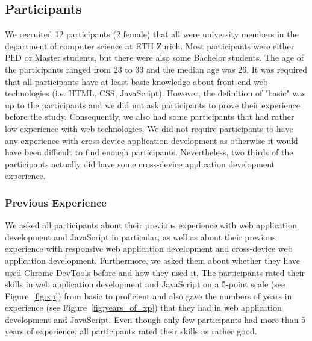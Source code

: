 \subsection{Participants}

We recruited 12 participants (2 female) that all were university members in the department of computer science at ETH Zurich. Most participants were either PhD or Master students, but there were also some Bachelor students. The age of the participants ranged from 23 to 33 and the median age was 26. It was required that all participants have at least basic knowledge about front-end web technologies (i.e. HTML, CSS, JavaScript). However, the definition of "basic" was up to the participants and we did not ask participants to prove their experience before the study. Consequently, we also had some participants that had rather low experience with web technologies. We did not require participants to have any experience with cross-device application development as otherwise it would have been difficult to find enough participants. Nevertheless, two thirds of the participants actually did have some cross-device application development experience. 

\subsubsection{Previous Experience}
We asked all participants about their previous experience with web application development and JavaScript in particular, as well as about their previous experience with responsive web application development and cross-device web application development. Furthermore, we asked them about whether they have used Chrome DevTools before and how they used it. The participants rated their skills in web application development and JavaScript on a 5-point scale (see Figure~\ref{fig:xp}) from basic to proficient and also gave the numbers of years in experience (see Figure~\ref{fig:years_of_xp}) that they had in web application development and JavaScript. Even though only few participants had more than 5 years of experience, all participants rated their skills as rather good.

